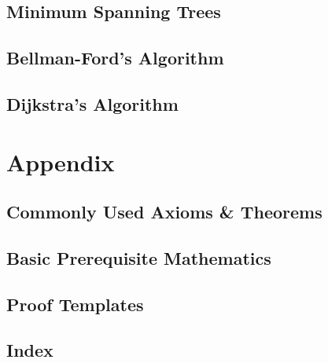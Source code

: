 \documentclass[11pt,fleqn,dvipsnames]{book} %
\begin{document}
\chapter{Minimum Spanning Trees}

\chapter{Bellman-Ford's Algorithm}

\chapter{Dijkstra's Algorithm}





\part*{Appendix}
\appendix
\chapter*{Commonly Used Axioms \& Theorems}


\chapter*{Basic Prerequisite Mathematics}


\chapter*{Proof Templates}



\chapter*{Index}
\end{document}
